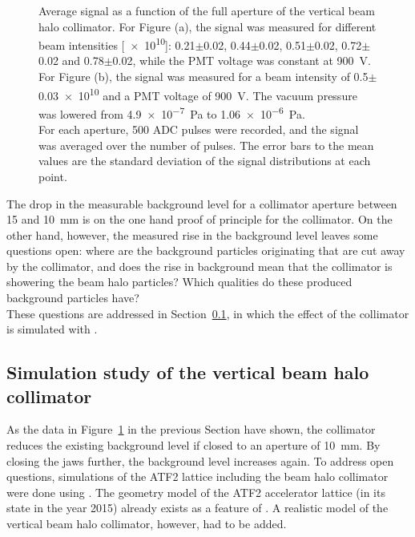 \begin{figure}
\caption[RHUL Cherenkov detector signal vs. collimator aperture]{
Average signal as a function of the full aperture of the vertical beam halo collimator. 
For Figure (a), the signal was measured for different beam intensities [\num{e10}]: 0.21$\pm$0.02, 0.44$\pm$0.02, 0.51$\pm$0.02, 0.72$\pm$0.02 and 0.78$\pm$0.02, while the PMT voltage was constant at \SI[detect-all]{900}{\volt}. 
\\For Figure (b), the signal was measured for a beam intensity of \num{0.5}$\pm$\num{0.03e10} and a PMT voltage of \SI[detect-all]{900}{\volt}. 
The vacuum pressure was lowered from \SI[detect-all]{4.9e-7}{\pascal} to \SI[detect-all]{1.06e-6}{\pascal}. 
\\For each aperture, 500 ADC pulses were recorded, and the signal was averaged over the number of pulses. 
The error bars to the mean values are the standard deviation of the signal distributions at each point.}
\label{fig:AverageSignal_Aperture_Symmetric}
\end{figure}

The drop in the measurable background level for a collimator aperture between 15 and \SI{10}{\milli\metre} is on the one hand proof of principle for the collimator.
On the other hand, however, the measured rise in the background level leaves some questions open: 
where are the background particles originating that are cut away by the collimator, and does the rise in background mean that the collimator is showering the beam halo particles? 
Which qualities do these produced background particles have? 
\\These questions are addressed in Section~\ref{sec:BDSIM_sim}, in which the effect of the collimator is simulated with \bdsim.

\subsection{Simulation study of the vertical beam halo collimator}
\label{sec:BDSIM_sim}
As the data in Figure~\ref{fig:AverageSignal_Aperture_Symmetric} in the previous Section have shown, the collimator reduces the existing background level if closed to an aperture of \SI{10}{\milli\metre}. 
By closing the jaws further, the background level increases again.
To address open questions, simulations of the ATF2 lattice including the beam halo collimator were done using \bdsim.
The geometry model of the ATF2 accelerator lattice (in its state in the year 2015) already exists as a feature of \bdsim.
A realistic model of the vertical beam halo collimator, however, had to be added.

